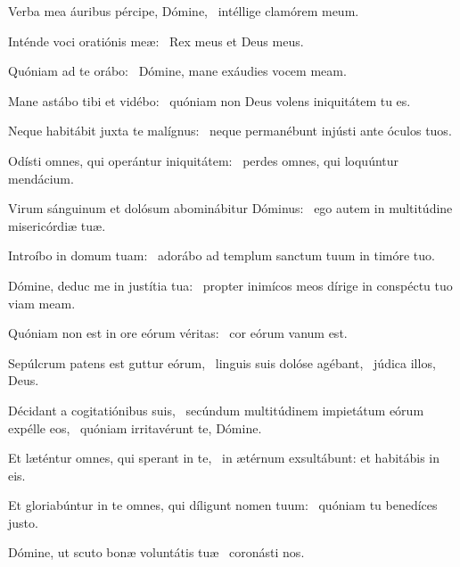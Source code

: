 \item Verba mea áuribus pércipe, Dómine,~\psstar{} intéllige clamórem meum.

\item Inténde voci oratiónis meæ:~\psstar{} Rex meus et Deus meus.

\item Quóniam ad te orábo:~\psstar{} Dómine, mane exáudies vocem meam.

\item Mane astábo tibi et vidébo:~\psstar{} quóniam non Deus volens iniquitátem tu es.

\item Neque habitábit juxta te malígnus:~\psstar{} neque permanébunt injústi ante óculos tuos.

\item Odísti omnes, qui operántur iniquitátem:~\psstar{} perdes omnes, qui loquúntur mendácium.

\item Virum sánguinum et dolósum abominábitur Dóminus:~\psstar{} ego autem in multitúdine misericórdiæ tuæ.

\item Introíbo in domum tuam:~\psstar{} adorábo ad templum sanctum tuum in timóre tuo.

\item Dómine, deduc me in justítia tua:~\psstar{} propter inimícos meos dírige in conspéctu tuo viam meam.

\item Quóniam non est in ore eórum véritas:~\psstar{} cor eórum vanum est.

\item Sepúlcrum patens est guttur eórum,~\pscross{} linguis suis dolóse agébant,~\psstar{} júdica illos, Deus.

\item Décidant a cogitatiónibus suis,~\pscross{} secúndum multitúdinem impietátum eórum expélle eos,~\psstar{} quóniam irritavérunt te, Dómine.

\item Et læténtur omnes, qui sperant in te,~\psstar{} in ætérnum exsultábunt: et habitábis in eis.

\item Et gloriabúntur in te omnes, qui díligunt nomen tuum:~\psstar{} quóniam tu benedíces justo.

\item Dómine, ut scuto bonæ voluntátis tuæ~\psstar{} coronásti nos.

